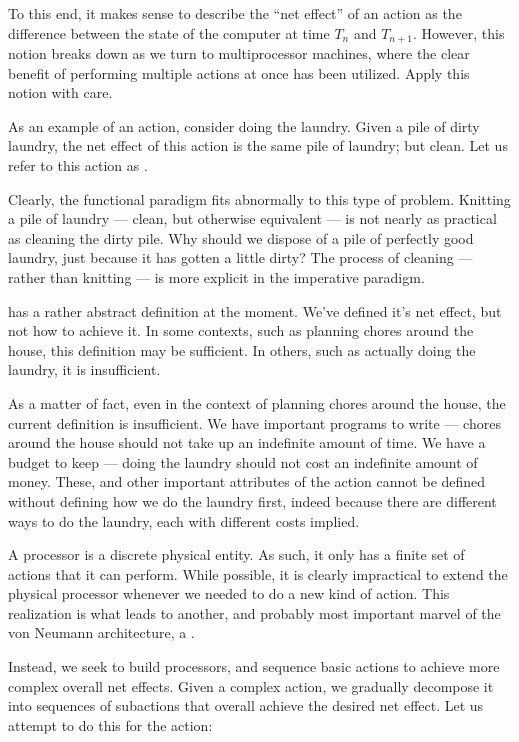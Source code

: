 To this end, it makes sense to describe the ``net effect'' of an action as the
difference between the state of the computer at time $T_n$ and $T_{n+1}$.
However, this notion breaks down as we turn to multiprocessor machines, where
the clear benefit of performing multiple actions at once has been utilized.
Apply this notion with care.


As an example of an action, consider doing the laundry. Given a pile of dirty
laundry, the net effect of this action is the same pile of laundry; but clean.
Let us refer to this action as .

Clearly, the functional paradigm fits abnormally to this type of problem.
Knitting a pile of laundry --- clean, but otherwise equivalent --- is not
nearly as practical as cleaning the dirty pile. Why should we dispose of a pile
of perfectly good laundry, just because it has gotten a little dirty? The
process of cleaning --- rather than knitting --- is more explicit in the
imperative paradigm.

 has a rather abstract definition at the moment. We've
defined it's net effect, but not how to achieve it. In some contexts, such as
planning chores around the house, this definition may be sufficient. In others,
such as actually doing the laundry, it is insufficient.

As a matter of fact, even in the context of planning chores around the house,
the current definition is insufficient. We have important programs to write ---
chores around the house should not take up an indefinite amount of time. We
have a budget to keep --- doing the laundry should not cost an indefinite
amount of money. These, and other important attributes of the action cannot be
defined without defining how we do the laundry first, indeed because there are
different ways to do the laundry, each with different costs implied.

A processor is a discrete physical entity. As such, it only has a finite set of
actions that it can perform. While possible, it is clearly impractical to
extend the physical processor whenever we needed to do a new kind of action.
This realization is what leads to another, and probably most important marvel
of the von Neumann architecture, a .

Instead, we seek to build  processors, and sequence basic
actions to achieve more complex overall net effects. Given a complex action, we
gradually decompose it into sequences of subactions that overall achieve the
desired net effect. Let us attempt to do this for the 
action:

